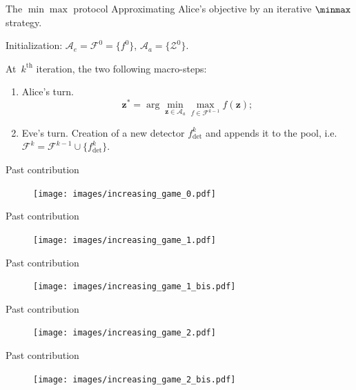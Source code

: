 \documentclass[10pt]{beamer}
\newcommand{\fdet}{f_{\mathrm{det}}}
\newcommand{\fset}{\mathcal{F}}
\begin{document}
\begin{frame}{The $\min\max$ protocol}
\alert{Approximating Alice's objective by an iterative $\minmax$ strategy.} 

\pause
Initialization: $\mathcal{A}_e = \fset^{0} = \{f^0\}$,  $\mathcal{A}_a = \{\mathcal{Z}^0\}$.
\pause

At~$k^{\mathrm{th}}$ iteration, the two following macro-steps: 
\begin{enumerate}
	\item \alert<2>{Alice's turn.} 
	\begin{equation}
	\mathbf{z}^\ast = \arg \min_{\mathbf{z} \in \mathcal{A}_a} \max_{f \in \fset^{k-1}} f(\mathbf{z});
	\label{eq:stepone}	
	\end{equation}
    \pause
	\item \alert<3>{Eve's turn.} Creation of a new detector $\fdet^k$ and appends it to the pool, i.e. $\fset^k = \fset^{k-1} \cup \{\fdet^k\}.$
\end{enumerate}
\end{frame}



\begin{frame}{Past contribution}
  \begin{figure}
        \texttt{[image: images/increasing\_game\_0.pdf]}
\end{figure}
\end{frame}

\begin{frame}{Past contribution}
  \begin{figure}
        \texttt{[image: images/increasing\_game\_1.pdf]}
\end{figure}
\end{frame}


\begin{frame}{Past contribution}
  \begin{figure}
        \texttt{[image: images/increasing\_game\_1\_bis.pdf]}
\end{figure}
\end{frame}


\begin{frame}{Past contribution}
  \begin{figure}
        \texttt{[image: images/increasing\_game\_2.pdf]}
\end{figure}
\end{frame}

\begin{frame}{Past contribution}
  \begin{figure}
        \texttt{[image: images/increasing\_game\_2\_bis.pdf]}
\end{figure}
\end{frame}
\end{document}
